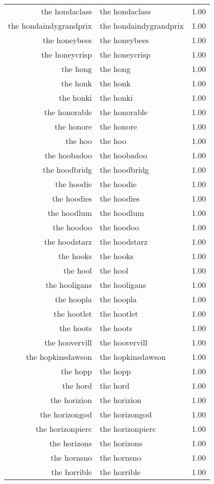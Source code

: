 \begin{table}[ht]
\begin{tabular}{rlr}
  the hondaclass & the hondaclass & 1.00 \\ 
  the hondaindygrandprix & the hondaindygrandprix & 1.00 \\ 
  the honeybees & the honeybees & 1.00 \\ 
  the honeycrisp & the honeycrisp & 1.00 \\ 
  the hong & the hong & 1.00 \\ 
  the honk & the honk & 1.00 \\ 
  the honki & the honki & 1.00 \\ 
  the honorable & the honorable & 1.00 \\ 
  the honore & the honore & 1.00 \\ 
  the hoo & the hoo & 1.00 \\ 
  the hoobadoo & the hoobadoo & 1.00 \\ 
  the hoodbridg & the hoodbridg & 1.00 \\ 
  the hoodie & the hoodie & 1.00 \\ 
  the hoodies & the hoodies & 1.00 \\ 
  the hoodlum & the hoodlum & 1.00 \\ 
  the hoodoo & the hoodoo & 1.00 \\ 
  the hoodstarz & the hoodstarz & 1.00 \\ 
  the hooks & the hooks & 1.00 \\ 
  the hool & the hool & 1.00 \\ 
  the hooligans & the hooligans & 1.00 \\ 
  the hoopla & the hoopla & 1.00 \\ 
  the hootlet & the hootlet & 1.00 \\ 
  the hoots & the hoots & 1.00 \\ 
  the hoovervill & the hoovervill & 1.00 \\ 
  the hopkinsdawson & the hopkinsdawson & 1.00 \\ 
  the hopp & the hopp & 1.00 \\ 
  the hord & the hord & 1.00 \\ 
  the horizion & the horizion & 1.00 \\ 
  the horizongod & the horizongod & 1.00 \\ 
  the horizonpierc & the horizonpierc & 1.00 \\ 
  the horizons & the horizons & 1.00 \\ 
  the hornsno & the hornsno & 1.00 \\ 
  the horrible & the horrible & 1.00 \\ 

\end{tabular}
\end{table}
